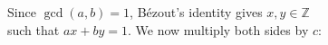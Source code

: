 \documentclass[preview]{standalone}
\begin{document}
\begin{center}
Since $\gcd(a, b) = 1$, Bézout's identity gives $x, y \in \mathbb{Z}$ \\such that $ax + by = 1$. We now multiply both sides by $c$:
\end{center}
\end{document}
